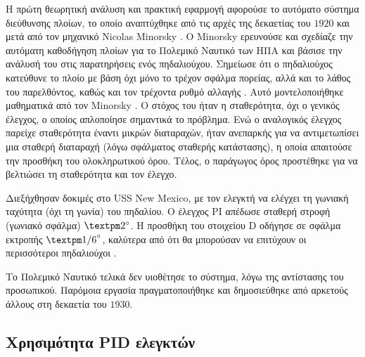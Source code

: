 Η πρώτη θεωρητική ανάλυση και πρακτική εφαρμογή αφορούσε το αυτόματο σύστημα διεύθυνσης πλοίων, το οποίο αναπτύχθηκε από τις αρχές της δεκαετίας του $1920$ και μετά από τον μηχανικό Nicolas Minorsky \cite{origin8}. Ο Minorsky ερευνούσε και σχεδίαζε την αυτόματη καθοδήγηση πλοίων για το Πολεμικό Ναυτικό των ΗΠΑ και βάσισε την ανάλυσή του στις παρατηρήσεις ενός πηδαλιούχου. Σημείωσε ότι ο πηδαλιούχος κατεύθυνε το πλοίο με βάση όχι μόνο το τρέχον σφάλμα πορείας, αλλά και το λάθος του παρελθόντος, καθώς και τον τρέχοντα ρυθμό αλλαγής \cite{origin9}. Αυτό μοντελοποιήθηκε μαθηματικά από τον Minorsky \cite{origin3}. Ο στόχος του ήταν η σταθερότητα, όχι ο γενικός έλεγχος, ο οποίος απλοποίησε σημαντικά το πρόβλημα. Ενώ ο αναλογικός έλεγχος παρείχε σταθερότητα έναντι μικρών διαταραχών, ήταν ανεπαρκής για να αντιμετωπίσει μια σταθερή διαταραχή (λόγω σφάλματος σταθερής κατάστασης), η οποία απαιτούσε την προσθήκη του ολοκληρωτικού όρου. Τέλος, ο παράγωγος όρος προστέθηκε για να βελτιώσει τη σταθερότητα και τον έλεγχο.

Διεξήχθησαν δοκιμές στο USS New Mexico, με τον ελεγκτή να ελέγχει τη γωνιακή ταχύτητα (όχι τη γωνία) του πηδαλίου. Ο έλεγχος PI απέδωσε σταθερή στροφή (γωνιακό σφάλμα) $±2\degree$. Η προσθήκη του στοιχείου D οδήγησε σε σφάλμα εκτροπής $±{1/6}\degree$, καλύτερα από ότι θα μπορούσαν να επιτύχουν οι περισσότεροι πηδαλιούχοι \cite{origin10}.

Το Πολεμικό Ναυτικό τελικά δεν υιοθέτησε το σύστημα, λόγω της αντίστασης του προσωπικού. Παρόμοια εργασία πραγματοποιήθηκε και δημοσιεύθηκε από αρκετούς άλλους στη δεκαετία του $1930$.

\paragraph{}


\subsection{Χρησιμότητα PID ελεγκτών}

